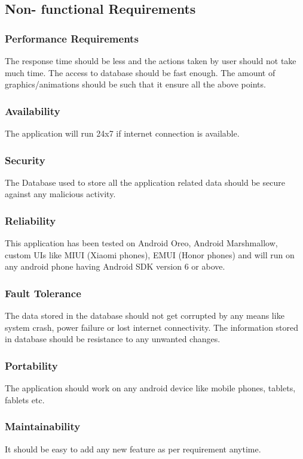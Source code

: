 \documentclass{report}
\begin{document}
\subsection{Non- functional Requirements}

\subsubsection{Performance Requirements}
The response time should be less and the actions taken by user should not take much time. The access to database should be fast enough. The amount of graphics/animations should be such that it ensure all the above points.

\subsubsection{Availability}
The application will run 24x7 if internet connection is available.

\subsubsection{Security}
The Database used to store all the application related data should be secure against any malicious activity.

\subsubsection{Reliability}
This application has been tested on Android Oreo, Android Marshmallow, custom UIs like MIUI (Xiaomi phones), EMUI (Honor phones) and will run on any android phone having Android SDK version 6 or above.

\subsubsection{Fault Tolerance}
The data stored in the database should not get corrupted by any means like system crash, power failure or lost internet connectivity. The information stored in database should be resistance to any unwanted changes.

\subsubsection{Portability}
The application should work on any android device like mobile phones, tablets, fablets etc.

\subsubsection{Maintainability}
It should be easy to add any new feature as per requirement anytime.
\end{document}
